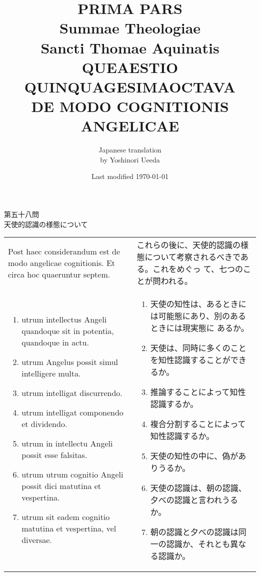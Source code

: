 \documentclass[10pt]{jsarticle} %
\title{{\bf PRIMA PARS}\\{\HUGE Summae Theologiae}\\Sancti Thomae
Aquinatis\\{\sffamily QUEAESTIO QUINQUAGESIMAOCTAVA}\\DE MODO
COGNITIONIS ANGELICAE}
\author{Japanese translation\\by Yoshinori {\sc Ueeda}}
\date{Last modified \today}
\begin{document}
\maketitle
\pagestyle{fancy}

\begin{center}
{\Large 第五十八問\\天使的認識の様態について}
\end{center}

\begin{longtable}{p{21em}p{21em}}
Post haec considerandum est de modo angelicae cognitionis. Et circa hoc
 quaeruntur septem. 

&

これらの後に、天使的認識の様態について考察されるべきである。これをめぐっ
 て、七つのことが問われる。


\\


\begin{enumerate}
 \item utrum intellectus Angeli quandoque sit in
 potentia, quandoque in actu.
 \item utrum Angelus possit simul
 intelligere multa.
 \item utrum intelligat discurrendo.
 \item utrum
 intelligat componendo et dividendo.
 \item utrum in intellectu Angeli
 possit esse falsitas.
 \item utrum utrum cognitio Angeli possit dici matutina
 et vespertina.
 \item utrum sit eadem cognitio matutina et
 vespertina, vel diversae.
\end{enumerate}


 &

 \begin{enumerate}
  \item 天使の知性は、あるときには可能態にあり、別のあるときには現実態に
	あるか。
  \item 天使は、同時に多くのことを知性認識することができるか。
  \item 推論することによって知性認識するか。
  \item 複合分割することによって知性認識するか。
  \item 天使の知性の中に、偽がありうるか。
  \item 天使の認識は、朝の認識、夕べの認識と言われうるか。
  \item 朝の認識と夕べの認識は同一の認識か、それとも異なる認識か。
 \end{enumerate}

\end{longtable}
\end{document}
